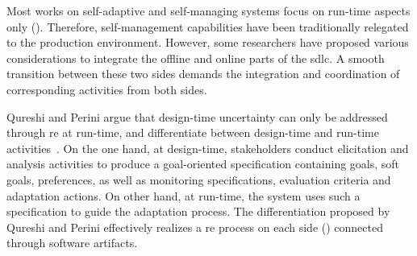 Most works on self-adaptive and self-managing systems focus on run-time aspects only (). Therefore, self-management capabilities have been traditionally relegated to the production environment. However, some researchers have proposed various considerations to integrate the offline and online parts of the \gls{sdlc}. A smooth transition between these two sides demands the integration and coordination of corresponding activities from both sides.


Qureshi and Perini argue that design-time uncertainty can only be addressed through \gls{re} at run-time, and differentiate between design-time and run-time activities~\cite{qureshi-2010-requirements}. On the one hand, at design-time, stakeholders conduct elicitation and analysis activities to produce a goal-oriented specification containing goals, soft goals, preferences, as well as monitoring specifications, evaluation criteria and adaptation actions. On other hand, at run-time, the system uses such a specification to guide the adaptation process. The differentiation proposed by Qureshi and Perini effectively realizes a \gls{re} process on each side () connected through software artifacts.

